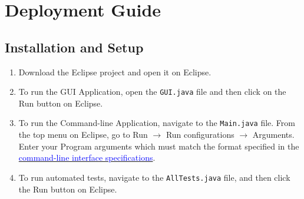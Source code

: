 \documentclass[12pt]{article}
\newcommand{\be}{\begin{enumerate}}
\newcommand{\ee}{\end{enumerate}}
\newcommand{\code}[1]{\texttt{#1}}
\begin{document}
\newpage

\tableofcontents

\newpage

\section{Deployment Guide}

\subsection{Installation and Setup}
\be
	\item Download the Eclipse project and open it on Eclipse. 
	\item To run the GUI Application, open the \code{GUI.java} file and then click on the Run button on Eclipse. 
	\item To run the Command-line Application, navigate to the \code{Main.java} file. From the top menu on Eclipse, go to Run $\rightarrow$ Run configurations $\rightarrow$ Arguments. Enter your Program arguments which must match the format specified in the \hyperref[sec:cmdlineinterface]{\textcolor{blue}{command-line interface specifications}}. 
	\item To run automated tests, navigate to the \code{AllTests.java} file, and then click the Run button on Eclipse.
\ee
\end{document}

